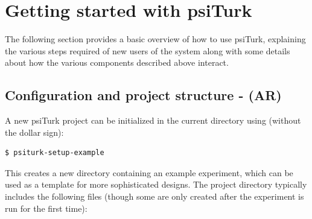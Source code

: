 \documentclass[twocolumn]{svjour3}          %
\newcommand{\psiturk}[0]{\textsf{psiTurk}}
\begin{document}
\section{Getting started with \psiturk{}}

The following section provides a basic overview of how to use \psiturk{},
explaining the various steps required of new users of the system along with
some details about how the various components described above interact.

\subsection{Configuration and project structure - (AR)}

A new \psiturk{} project can be initialized in the current directory using (without the dollar sign):

\begin{lstlisting}
$ psiturk-setup-example
\end{lstlisting}

\noindent This creates a new directory containing an example experiment,
which can be used as a template for more sophisticated designs.
The project directory typically includes the following files (though some are only
created after the experiment is run for the first time):
\end{document}
